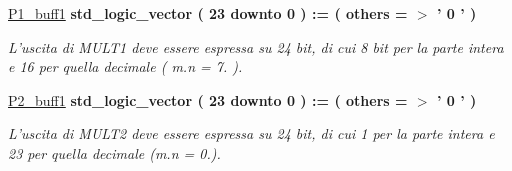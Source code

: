 \begin{DoxyCompactItemize}
\hyperlink{group___linear_regression_gaa62b4451249556c1f9acb08b9bb1ba81}{P1\+\_\+buff1} {\bfseries \textcolor{vhdlchar}{std\+\_\+logic\+\_\+vector}\textcolor{vhdlchar}{ }\textcolor{vhdlchar}{(}\textcolor{vhdlchar}{ }\textcolor{vhdlchar}{ } \textcolor{vhdldigit}{23} \textcolor{vhdlchar}{ }\textcolor{vhdlchar}{downto}\textcolor{vhdlchar}{ }\textcolor{vhdlchar}{ } \textcolor{vhdldigit}{0} \textcolor{vhdlchar}{ }\textcolor{vhdlchar}{)}\textcolor{vhdlchar}{ }\textcolor{vhdlchar}{ }\textcolor{vhdlchar}{ }\textcolor{vhdlchar}{\+:}\textcolor{vhdlchar}{=}\textcolor{vhdlchar}{ }\textcolor{vhdlchar}{(}\textcolor{vhdlchar}{ }\textcolor{vhdlchar}{ }\textcolor{vhdlchar}{others}\textcolor{vhdlchar}{ }\textcolor{vhdlchar}{ }\textcolor{vhdlchar}{=}\textcolor{vhdlchar}{ }\textcolor{vhdlchar}{$>$}\textcolor{vhdlchar}{ }\textcolor{vhdlchar}{'}\textcolor{vhdlchar}{ } \textcolor{vhdldigit}{0} \textcolor{vhdlchar}{ }\textcolor{vhdlchar}{'}\textcolor{vhdlchar}{ }\textcolor{vhdlchar}{)}\textcolor{vhdlchar}{ }} 
\begin{DoxyCompactList}\small\item\em L'uscita di M\+U\+L\+T1 deve essere espressa su 24 bit, di cui 8 bit per la parte intera e 16 per quella decimale ( m.\+n = 7. ). \end{DoxyCompactList}\item 
\hyperlink{group___linear_regression_ga8f8c92d3996ed1be653d65bfa9a063da}{P2\+\_\+buff1} {\bfseries \textcolor{vhdlchar}{std\+\_\+logic\+\_\+vector}\textcolor{vhdlchar}{ }\textcolor{vhdlchar}{(}\textcolor{vhdlchar}{ }\textcolor{vhdlchar}{ } \textcolor{vhdldigit}{23} \textcolor{vhdlchar}{ }\textcolor{vhdlchar}{downto}\textcolor{vhdlchar}{ }\textcolor{vhdlchar}{ } \textcolor{vhdldigit}{0} \textcolor{vhdlchar}{ }\textcolor{vhdlchar}{)}\textcolor{vhdlchar}{ }\textcolor{vhdlchar}{ }\textcolor{vhdlchar}{ }\textcolor{vhdlchar}{\+:}\textcolor{vhdlchar}{=}\textcolor{vhdlchar}{ }\textcolor{vhdlchar}{(}\textcolor{vhdlchar}{ }\textcolor{vhdlchar}{ }\textcolor{vhdlchar}{others}\textcolor{vhdlchar}{ }\textcolor{vhdlchar}{ }\textcolor{vhdlchar}{=}\textcolor{vhdlchar}{ }\textcolor{vhdlchar}{$>$}\textcolor{vhdlchar}{ }\textcolor{vhdlchar}{'}\textcolor{vhdlchar}{ } \textcolor{vhdldigit}{0} \textcolor{vhdlchar}{ }\textcolor{vhdlchar}{'}\textcolor{vhdlchar}{ }\textcolor{vhdlchar}{)}\textcolor{vhdlchar}{ }} 
\begin{DoxyCompactList}\small\item\em L'uscita di M\+U\+L\+T2 deve essere espressa su 24 bit, di cui 1 per la parte intera e 23 per quella decimale (m.\+n = 0.). \end{DoxyCompactList}\item 

\end{DoxyCompactItemize}
